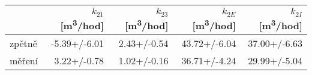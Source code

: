 \begin{tabular}{lrrrr}
\toprule
{} & $k_{21}$ [\si{m^3/hod}] & $k_{23}$ [\si{m^3/hod}] & $k_{2E}$ [\si{m^3/hod}] & $k_{2I}$ [\si{m^3/hod}] \\
\midrule
zpětně &            -5.39+/-6.01 &             2.43+/-0.54 &            43.72+/-6.04 &            37.00+/-6.63 \\
měření &             3.22+/-0.78 &             1.02+/-0.16 &            36.71+/-4.24 &            29.99+/-5.04 \\
\bottomrule
\end{tabular}
